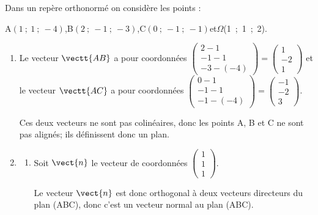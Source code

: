 
\medskip

Dans un repère orthonormé \Oijk{} on considère les points :
\begin{center} A$(1~;~1~;~-4)$,\quad B$(2~;~-1~;~-3)$,\quad  C$(0~;~-1~;~-1)$\quad  et\quad  $\Omega$(1~;~1~;~2).\end{center}

\smallskip

\begin{enumerate}
\item%
Le vecteur $\vectt{AB}$ a pour coordonnées
$\begin{pmatrix}
2-1 \\ -1-1 \\-3-(-4)
\end{pmatrix}
=
\begin{pmatrix}
1 \\ -2 \\ 1
\end{pmatrix}$
 et le vecteur $\vectt{AC}$ a pour coordonnées
$\begin{pmatrix}
0-1 \\ -1-1 \\-1-(-4)
\end{pmatrix}
=
\begin{pmatrix}
-1 \\ -2 \\ 3
\end{pmatrix}$.

Ces deux vecteurs ne sont pas colinéaires, donc les points A, B et C ne sont pas alignés; ils définissent donc un plan.
 
\item 
	\begin{enumerate}
		\item Soit  $\vect{n}$ le vecteur de coordonnées $\begin{pmatrix}1\\1\\1\end{pmatrix}$.
		

Le vecteur $\vect{n}$ est donc orthogonal à deux vecteurs directeurs du plan (ABC), donc c'est un vecteur normal au plan (ABC).
		

\end{enumerate}
\end{enumerate}
